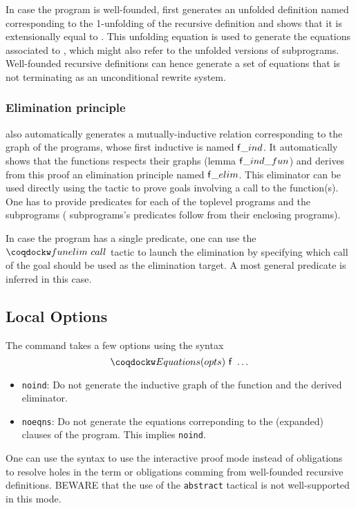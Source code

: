 In case the program is well-founded, \Equations first generates an
unfolded definition named  corresponding to the
1-unfolding of the recursive definition and shows that it is
extensionally equal to . This unfolding equation is used
to generate the equations associated to , which might also
refer to the unfolded versions of subprograms. Well-founded
recursive definitions can hence generate a set of equations that
is not terminating as an unconditional rewrite system.

\subsubsection{Elimination principle}

\Equations also automatically generates a mutually-inductive relation
corresponding to the graph of the programs, whose first inductive is named
$\mbox{\textsf{f}}\_ind$. It automatically shows that the functions respects their
graphs (lemma $\mbox{\textsf{f}}\_ind\_fun$) and derives from this proof an
elimination principle named $\mbox{\textsf{f}}\_elim$. This eliminator can be used
directly using the  tactic to prove goals involving a call to
the function(s). One has to provide predicates for each of the toplevel
programs and the  subprograms ( subprograms's
predicates follow from their enclosing programs).

In case the program has a single predicate, one can use the
$\tac{funelim}~call$ tactic to launch the elimination by specifying
which call of the goal should be used as the elimination target.
A most general predicate is inferred in this case.

\subsection{Local Options}
The  command takes a few options using the syntax
\[\kw{Equations}(opts)~\cst{f}~\ldots\]

\begin{itemize}
\item \texttt{noind}: Do not generate the inductive graph of the
  function and the derived eliminator.
\item \texttt{noeqns}: Do not generate the equations correponding to the
  (expanded) clauses of the program. This implies \texttt{noind}.
\end{itemize}

One can use the  syntax to use the interactive proof mode
instead of obligations to resolve holes in the term or obligations
comming from well-founded recursive definitions. BEWARE that the use
of the \texttt{abstract} tactical is not well-supported in this mode.

